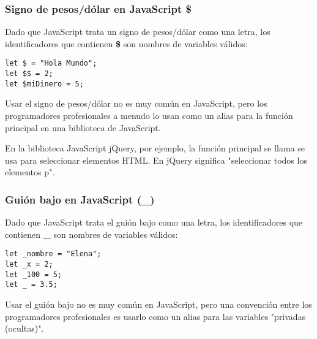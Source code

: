 \begin{frame}[fragile]
  \frametitle{Signo de pesos/dólar en JavaScript \$}

  Dado que JavaScript trata un signo de pesos/dólar como
  una letra, los identificadores que contienen \textbf{\$} son
  nombres de variables válidos:

  \vspace{\baselineskip}
  \begin{lstlisting}
let $ = "Hola Mundo";
let $$ = 2;
let $miDinero = 5;
  \end{lstlisting}

  \vspace{\baselineskip}
  Usar el signo de pesos/dólar no es muy común en JavaScript,
  pero los programadores profesionales a menudo lo usan como
  un alias para la función principal en una biblioteca de
  JavaScript.

  \vspace{\baselineskip}
  En la biblioteca JavaScript jQuery, por ejemplo, la función
  principal se llama \eti{\$} se usa para seleccionar elementos
  HTML. En jQuery  significa "seleccionar todos
  los elementos p".
\end{frame}

\begin{frame}[fragile]
  \frametitle{Guión bajo en JavaScript (\_)}

  Dado que JavaScript trata el guión bajo como una letra,
  los identificadores que contienen \textbf{\_} son nombres
  de variables válidos:

  \vspace{\baselineskip}
  \begin{lstlisting}
let _nombre = "Elena";
let _x = 2;
let _100 = 5;
let _ = 3.5;
  \end{lstlisting}

  \vspace{\baselineskip}
  Usar el guión bajo no es muy común en JavaScript, pero una
  convención entre los programadores profesionales es usarlo
  como un alias para las variables "privadas (ocultas)".
\end{frame}




\begin{frame}[fragile]
  \frametitle{}

  \vspace{\baselineskip}
  \begin{lstlisting}
  \end{lstlisting}
\end{frame}

\begin{frame}[c]{}
\end{frame}
